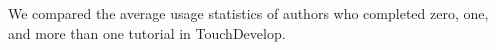 
\subsection{\rqengagement}

We compared the average usage statistics of authors who completed zero, one, and more than one tutorial in TouchDevelop.